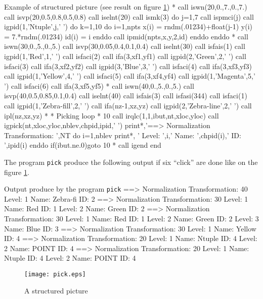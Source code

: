 \begin{XMPt}{Example of structured picture (see result on figure \ref{PICK})}
*
      call iswn(20,0.,7.,0.,7.)
      call isvp(20,0.5,0.8,0.5,0.8)
      call iselnt(20)
      call ismk(3)
      do j=1,7
         call ispmci(j)
         call igpid(1,'Ntuple',j,' ')
         do k=1,10
            do i=1,npts
               x(i)  = rndm(.01234)+float(j-1)
               y(i)  = 7.*rndm(.01234)
               id(i) = i 
            enddo
            call ipmid(npts,x,y,2,id)
         enddo
      enddo
*
      call iswn(30,0.,5.,0.,5.)
      call isvp(30,0.05,0.4,0.1,0.4)
      call iselnt(30)
      call isfais(1)
      call igpid(1,'Red',1,' ')
      call isfaci(2)
      call ifa(3,xf1,yf1)
      call igpid(2,'Green',2,' ')
      call isfaci(3)
      call ifa(3,xf2,yf2)
      call igpid(3,'Blue',3,' ')
      call isfaci(4)
      call ifa(3,xf3,yf3)
      call igpid(1,'Yellow',4,' ')
      call isfaci(5)
      call ifa(3,xf4,yf4)
      call igpid(1,'Magenta',5,' ')
      call isfaci(6)
      call ifa(3,xf5,yf5)
*
      call iswn(40,0.,5.,0.,5.)
      call isvp(40,0.5,0.85,0.1,0.4)
      call iselnt(40)
      call isfais(3)
      call isfasi(344)
      call isfaci(1)
      call igpid(1,'Zebra-fill',2,' ')
      call ifa(nz-1,xz,yz)
      call igpid(2,'Zebra-line',2,' ')
      call ipl(nz,xz,yz)
*
*              Picking loop
*
  10  call irqlc(1,1,ibut,nt,xloc,yloc)
      call igpick(nt,xloc,yloc,nblev,chpid,ipid,' ')
      print*,'==> Normalization Transformation: ',NT
      do i=1,nblev
         print*, '    Level: ',i,' Name: ',chpid(i),' ID: ',ipid(i)
      enddo
      if(ibut.ne.0)goto 10
*
      call igend
      end
\end{XMPt}

The program {\tt pick} produce the following output if six ``click'' 
are done like on the figure \ref{PICK}.

\begin{XMPt}{Output produce by the program {\tt pick}}
 ==> Normalization Transformation:  40
     Level:  1 Name: Zebra-fi ID:  2
 ==> Normalization Transformation:  30
     Level:  1 Name: Red      ID:  1
     Level:  2 Name: Green    ID:  2
 ==> Normalization Transformation:  30
     Level:  1 Name: Red      ID:  1
     Level:  2 Name: Green    ID:  2
     Level:  3 Name: Blue     ID:  3
 ==> Normalization Transformation:  30
     Level:  1 Name: Yellow   ID:  4
 ==> Normalization Transformation:  20
     Level:  1 Name: Ntuple   ID:  4
     Level:  2 Name: POINT    ID:  4
 ==> Normalization Transformation:  20
     Level:  1 Name: Ntuple   ID:  4
     Level:  2 Name: POINT    ID:  4
\end{XMPt}

\begin{figure}[p]
\begin{center}
\texttt{[image: pick.eps]}
\end{center}
\caption{A structured picture}
\label{PICK}
\end{figure}

